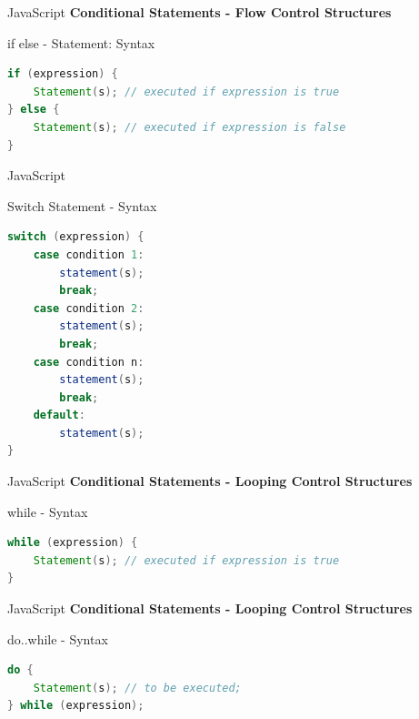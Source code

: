 \documentclass[14pt]{beamer}
\begin{document}
\begin{frame}[fragile]{JavaScript}
\textbf{Conditional Statements - Flow Control Structures}

\vspace{1pc}
\begin{block}{if else - Statement: Syntax}
\begin{lstlisting}[language=java]
if (expression) {
    Statement(s); // executed if expression is true
} else {
    Statement(s); // executed if expression is false
}
\end{lstlisting}
\end{block}
\end{frame}

\begin{frame}[fragile]{JavaScript}
\begin{block}{Switch Statement - Syntax}
\begin{lstlisting}[language=java]
switch (expression) {
    case condition 1: 
        statement(s);
        break;
    case condition 2: 
        statement(s);
        break;
    case condition n: 
        statement(s);
        break;
    default: 
        statement(s);
}
\end{lstlisting}
\end{block}
\end{frame}

\begin{frame}[fragile]{JavaScript}
\textbf{Conditional Statements - Looping Control Structures}

\vspace{1pc}
\begin{block}{while - Syntax}
\begin{lstlisting}[language=java]
while (expression) {
    Statement(s); // executed if expression is true
}
\end{lstlisting}
\end{block}
\end{frame}

\begin{frame}[fragile]{JavaScript}
\textbf{Conditional Statements - Looping Control Structures}

\vspace{1pc}
\begin{block}{do..while - Syntax}
\begin{lstlisting}[language=java]
do {
    Statement(s); // to be executed;
} while (expression);
\end{lstlisting}
\end{block}
\end{frame}
\end{document}
